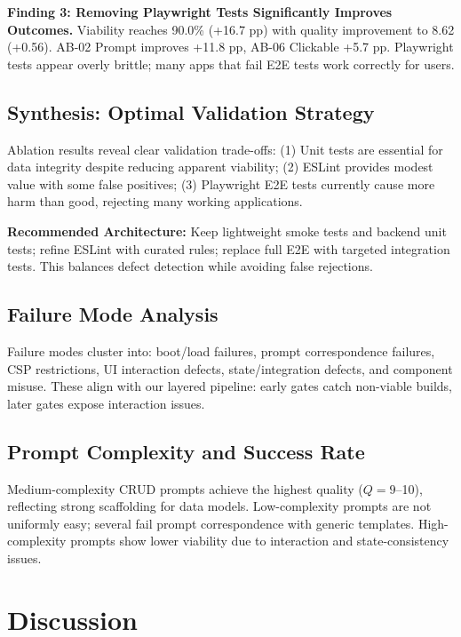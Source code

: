 \documentclass{article}
\begin{document}
\textbf{Finding 3: Removing Playwright Tests Significantly Improves Outcomes.} Viability reaches 90.0\% (+16.7 pp) with quality improvement to 8.62 (+0.56). AB-02 Prompt improves +11.8 pp, AB-06 Clickable +5.7 pp. Playwright tests appear overly brittle; many apps that fail E2E tests work correctly for users.

\subsection{Synthesis: Optimal Validation Strategy}

Ablation results reveal clear validation trade-offs: (1) Unit tests are essential for data integrity despite reducing apparent viability; (2) ESLint provides modest value with some false positives; (3) Playwright E2E tests currently cause more harm than good, rejecting many working applications.

\textbf{Recommended Architecture:} Keep lightweight smoke tests and backend unit tests; refine ESLint with curated rules; replace full E2E with targeted integration tests. This balances defect detection while avoiding false rejections.

\subsection{Failure Mode Analysis}

Failure modes cluster into: boot/load failures, prompt correspondence failures, CSP restrictions, UI interaction defects, state/integration defects, and component misuse. These align with our layered pipeline: early gates catch non-viable builds, later gates expose interaction issues.

\subsection{Prompt Complexity and Success Rate}
\label{sec:prompt-complexity}

Medium-complexity CRUD prompts achieve the highest quality ($Q=9$--10), reflecting strong scaffolding for data models. Low-complexity prompts are not uniformly easy; several fail prompt correspondence with generic templates. High-complexity prompts show lower viability due to interaction and state-consistency issues.

\section{Discussion}
\label{sec:discussion}
\end{document}
